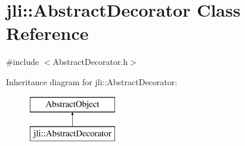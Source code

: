 \hypertarget{classjli_1_1_abstract_decorator}{\section{jli\+:\+:Abstract\+Decorator Class Reference}
\label{classjli_1_1_abstract_decorator}
}


{\ttfamily \#include $<$Abstract\+Decorator.\+h$>$}

Inheritance diagram for jli\+:\+:Abstract\+Decorator\+:\begin{figure}[H]
\begin{center}
\leavevmode
\includegraphics[height=2.000000cm]{classjli_1_1_abstract_decorator}
\end{center}
\end{figure}
